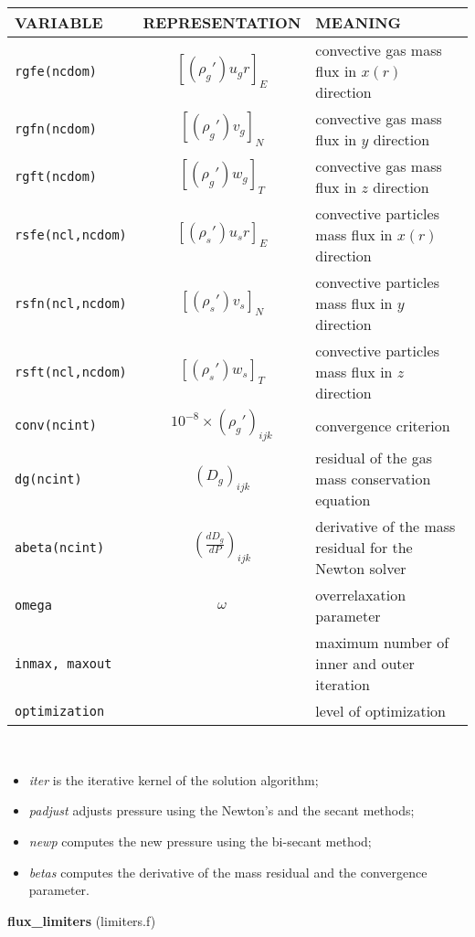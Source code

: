\begin{tabular}{|p{6cm}|c|p{6cm}|}\hline
VARIABLE & REPRESENTATION & MEANING\\\hline
\tt rgfe(ncdom) & $\left[ (\rho_g')u_g r \right]_{E} $ & convective gas mass flux in $x(r)$ direction\\\hline
\tt rgfn(ncdom) & $\left[ (\rho_g')v_g \right]_{N} $ & convective gas mass flux in $y$ direction\\\hline
\tt rgft(ncdom) & $\left[ (\rho_g')w_g \right]_{T} $ & convective gas mass flux in $z$ direction\\\hline
\tt rsfe(ncl,ncdom) & $\left[ (\rho_s')u_s r \right]_{E} $ & convective particles mass flux in $x(r)$ direction\\\hline
\tt rsfn(ncl,ncdom) & $\left[ (\rho_s')v_s \right]_{N} $ & convective particles mass flux in $y$ direction\\\hline
\tt rsft(ncl,ncdom) & $\left[ (\rho_s')w_s \right]_{T} $ & convective particles mass flux in $z$ direction\\\hline
\tt conv(ncint) & $10^{-8}\times(\rho_g')_{ijk}$ & convergence criterion\\\hline
\tt dg(ncint) & $(D_g)_{ijk}$ & residual of the gas mass conservation equation \\\hline
\tt abeta(ncint) & $\left(\frac{dD_g}{dP}\right)_{ijk}$ & derivative of the mass residual for the Newton solver\\\hline
\tt omega & $\omega$ & overrelaxation parameter \\\hline
\tt inmax, maxout && maximum number of inner and outer iteration\\\hline
\tt optimization && level of optimization\\\hline
\end{tabular}\\
\begin{itemize}
\item{\em iter} is the iterative kernel of the solution algorithm;
\item{\em padjust} adjusts pressure using the Newton's and the secant methods;
\item{\em newp} computes the new pressure using the bi-secant method;
\item{\em betas} computes the derivative of the mass residual and the convergence parameter.
\end{itemize}
%
%
{\large{\bf flux\_limiters}} (limiters.f)\\[5mm]
